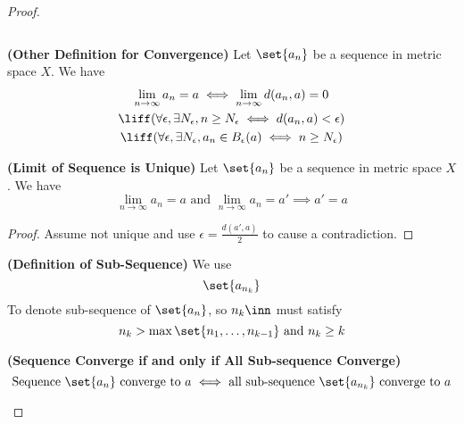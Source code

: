 \documentclass{report}
\begin{document}
\begin{proof}
\begin{definition}
\begin{equation*}
\end{equation*}
\end{definition}
\begin{theorem}
\label{3.1.5}
\textbf{(Other Definition for Convergence)} Let $\set{a_n}$ be a sequence in metric space $X$. We have
 \begin{gather*}
\lim_{n\to \infty}a_n=a\iff \lim_{n\to\infty}d(a_n,a)=0\\
\liff (\forall \epsilon ,\exists N_\epsilon, n\geq N_\epsilon \iff  d(a_n,a)<\epsilon) \\
\liff (\forall \epsilon, \exists N_\epsilon , a_n\in B_\epsilon (a)\iff  n\geq N_\epsilon )
\end{gather*}
\end{theorem}
\begin{theorem}
\label{3.1.6}
\textbf{(Limit of Sequence is Unique)} Let $\set{a_n}$ be a sequence in metric space $X$. We have
 \begin{equation*}
\lim_{n\to\infty}a_n=a\text{ and }\lim_{n\to\infty}a_n=a'\implies a'=a
\end{equation*}
\end{theorem}
\begin{proof}
Assume not unique and use $\epsilon=\frac{d(a',a)}{2}$ to cause a contradiction.
\end{proof}
\begin{definition}
\label{3.1.7}
\textbf{(Definition of Sub-Sequence)} We use
\begin{equation*}
\set{a_{n_k}}
\end{equation*}
To denote sub-sequence of $\set{a_n}$, so $n_k\inn$ must satisfy
 \begin{equation*}
n_k> \max \set{n_1,\dots, n_{k-1}}\text{ and }n_k\geq k 
\end{equation*}
\end{definition}
\begin{theorem}
\label{3.1.8}
\textbf{(Sequence Converge if and only if All Sub-sequence Converge)} 
\begin{equation*}
\text{ Sequence $\set{a_n}$ converge to $a$ $\iff $ all sub-sequence $\set{a_{n_k}}$ converge to $a$ }
\end{equation*}
\end{theorem}

\end{proof}
\end{document}
